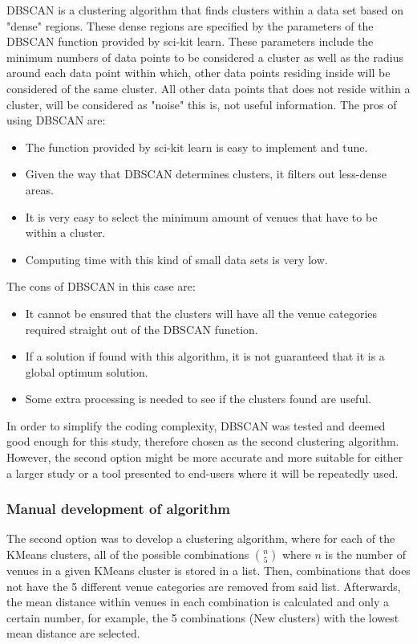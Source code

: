 \documentclass{article}
\begin{document}
		DBSCAN is a clustering algorithm that finds clusters within a data set based on "dense" regions. These dense regions are specified by the parameters of the DBSCAN function provided by sci-kit learn. These parameters include the minimum numbers of data points to be considered a cluster as well as the radius around each data point within which, other data points residing inside will be considered of the same cluster. All other data points that does not reside within a cluster, will be considered as "noise" this is, not useful information.
		The pros of using DBSCAN are:
		\begin{itemize}
			\item The function provided by sci-kit learn is easy to implement and tune.
			\item Given the way that DBSCAN determines clusters, it filters out less-dense areas.
			\item It is very easy to select the minimum amount of venues that have to be within a cluster.
			\item Computing time with this kind of small data sets is very low.
		\end{itemize}
		The cons of DBSCAN in this case are:
		\begin{itemize}
			\item It cannot be ensured that the clusters will have all the venue categories required straight out of the DBSCAN function.
			\item If a solution if found with this algorithm, it is not guaranteed that it is a global optimum solution.
			\item Some extra processing is needed to see if the clusters found are useful.
		\end{itemize}
		
		In order to simplify the coding complexity, DBSCAN was tested and deemed good enough for this study, therefore chosen as the second clustering algorithm. However, the second option might be more accurate and more suitable for either a larger study or a tool presented to end-users where it will be repeatedly used.
		\subsubsection{Manual development of algorithm}
		\label{subsec::MA}
		The second option was to develop a clustering algorithm, where for each of the KMeans clusters, all of the possible combinations $\binom{n}{5}$ where $n$ is the number of venues in a given KMeans cluster is stored in a list. Then, combinations that does not have the 5 different venue categories are removed from said list. Afterwards, the mean distance within venues in each combination is calculated and only a certain number, for example, the 5 combinations (New clusters) with the lowest mean distance are selected.
		
\end{document}
